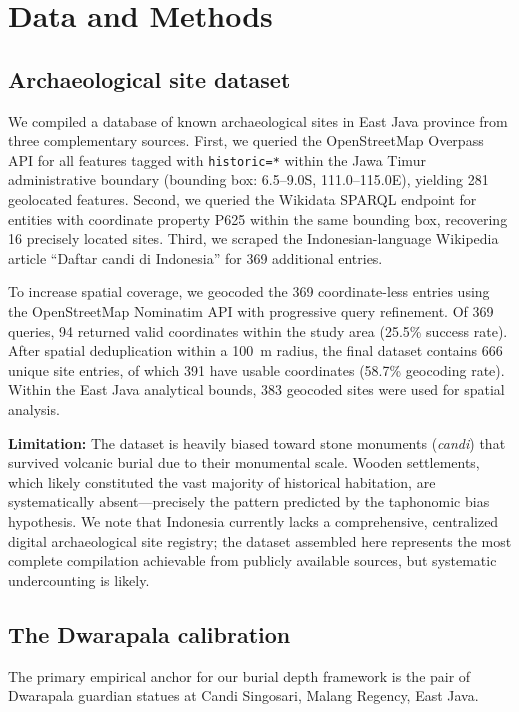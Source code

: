 \documentclass[12pt,letterpaper]{article}
\begin{document}
\section{Data and Methods}

\subsection{Archaeological site dataset}

We compiled a database of known archaeological sites in East Java province from three complementary sources. First, we queried the OpenStreetMap Overpass API for all features tagged with \texttt{historic=*} within the Jawa Timur administrative boundary (bounding box: 6.5--9.0\textdegree{}S, 111.0--115.0\textdegree{}E), yielding 281 geolocated features. Second, we queried the Wikidata SPARQL endpoint for entities with coordinate property P625 within the same bounding box, recovering 16 precisely located sites. Third, we scraped the Indonesian-language Wikipedia article ``Daftar candi di Indonesia'' for 369 additional entries.

To increase spatial coverage, we geocoded the 369 coordinate-less entries using the OpenStreetMap Nominatim API with progressive query refinement. Of 369 queries, 94 returned valid coordinates within the study area (25.5\% success rate). After spatial deduplication within a 100~m radius, the final dataset contains 666 unique site entries, of which 391 have usable coordinates (58.7\% geocoding rate). Within the East Java analytical bounds, 383 geocoded sites were used for spatial analysis.

\textbf{Limitation:} The dataset is heavily biased toward stone monuments (\textit{candi}) that survived volcanic burial due to their monumental scale. Wooden settlements, which likely constituted the vast majority of historical habitation, are systematically absent---precisely the pattern predicted by the taphonomic bias hypothesis. We note that Indonesia currently lacks a comprehensive, centralized digital archaeological site registry; the dataset assembled here represents the most complete compilation achievable from publicly available sources, but systematic undercounting is likely.

\subsection{The Dwarapala calibration}

The primary empirical anchor for our burial depth framework is the pair of Dwarapala guardian statues at Candi Singosari, Malang Regency, East Java.
\end{document}
